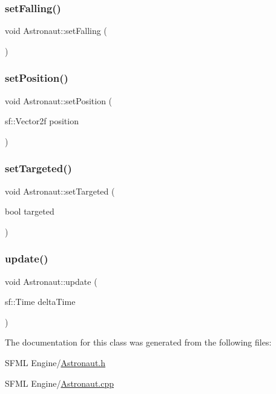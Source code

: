 \subsubsection{\texorpdfstring{set\+Falling()}{setFalling()}}
{\footnotesize\ttfamily void Astronaut\+::set\+Falling (\begin{DoxyParamCaption}{ }\end{DoxyParamCaption})}

\mbox{\label{class_astronaut_a76e03abf8dd510b493c4e079015725d8}} 
\subsubsection{\texorpdfstring{set\+Position()}{setPosition()}}
{\footnotesize\ttfamily void Astronaut\+::set\+Position (\begin{DoxyParamCaption}\item[{sf\+::\+Vector2f}]{position }\end{DoxyParamCaption})}

\mbox{\label{class_astronaut_aad3dde72837f3a51c18cfe70ce881f93}} 
\subsubsection{\texorpdfstring{set\+Targeted()}{setTargeted()}}
{\footnotesize\ttfamily void Astronaut\+::set\+Targeted (\begin{DoxyParamCaption}\item[{bool}]{targeted }\end{DoxyParamCaption})}

\mbox{\label{class_astronaut_a2df268d2fa9a1783fda0c772130cddd2}} 
\subsubsection{\texorpdfstring{update()}{update()}}
{\footnotesize\ttfamily void Astronaut\+::update (\begin{DoxyParamCaption}\item[{sf\+::\+Time}]{delta\+Time }\end{DoxyParamCaption})}



The documentation for this class was generated from the following files\+:\begin{DoxyCompactItemize}
\item 
S\+F\+M\+L Engine/\hyperlink{_astronaut_8h}{Astronaut.\+h}\item 
S\+F\+M\+L Engine/\hyperlink{_astronaut_8cpp}{Astronaut.\+cpp}\end{DoxyCompactItemize}
